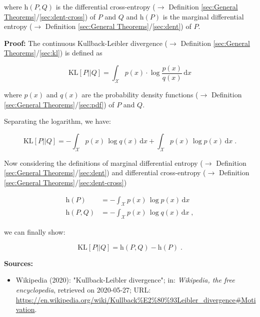 \documentclass[a4paper,12pt,twoside]{book}
\begin{document}
where $\mathrm{h}(P,Q)$ is the differential cross-entropy ($\rightarrow$ Definition \ref{sec:General Theorems}/\ref{sec:dent-cross}) of $P$ and $Q$ and $\mathrm{h}(P)$ is the marginal differential entropy ($\rightarrow$ Definition \ref{sec:General Theorems}/\ref{sec:dent}) of $P$.


\vspace{1em}
\textbf{Proof:} The continuous Kullback-Leibler divergence ($\rightarrow$ Definition \ref{sec:General Theorems}/\ref{sec:kl}) is defined as

\begin{equation} \label{eq:kl-dent-KL}
\mathrm{KL}[P||Q] = \int_{\mathcal{X}} p(x) \cdot \log \frac{p(x)}{q(x)} \, \mathrm{d}x
\end{equation}

where $p(x)$ and $q(x)$ are the probability density functions ($\rightarrow$ Definition \ref{sec:General Theorems}/\ref{sec:pdf}) of $P$ and $Q$.

Separating the logarithm, we have:

\begin{equation} \label{eq:kl-dent-KL-dev}
\mathrm{KL}[P||Q] = - \int_{\mathcal{X}} p(x) \, \log q(x) \, \mathrm{d}x + \int_{\mathcal{X}} p(x) \, \log p(x) \, \mathrm{d}x \; .
\end{equation}

Now considering the definitions of marginal differential entropy ($\rightarrow$ Definition \ref{sec:General Theorems}/\ref{sec:dent}) and differential cross-entropy ($\rightarrow$ Definition \ref{sec:General Theorems}/\ref{sec:dent-cross})

\begin{equation} \label{eq:kl-dent-MDE-DCE}
\begin{split}
\mathrm{h}(P) &= - \int_{\mathcal{X}} p(x) \, \log p(x) \, \mathrm{d}x \\
\mathrm{h}(P,Q) &= - \int_{\mathcal{X}} p(x) \, \log q(x) \, \mathrm{d}x \; ,
\end{split}
\end{equation}

we can finally show:

\begin{equation} \label{eq:kl-dent-KL-qed}
\mathrm{KL}[P||Q] = \mathrm{h}(P,Q) - \mathrm{h}(P) \; .
\end{equation}


\vspace{1em}
\textbf{Sources:}
\begin{itemize}
\item Wikipedia (2020): "Kullback-Leibler divergence"; in: \textit{Wikipedia, the free encyclopedia}, retrieved on 2020-05-27; URL: \url{https://en.wikipedia.org/wiki/Kullback%E2%80%93Leibler_divergence#Motivation}.
\end{itemize}
\end{document}
